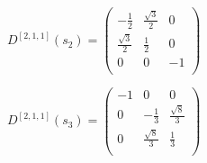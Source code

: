 \documentclass{article}
\begin{document}
$D^{[2,1,1]}(s_2) = \begin{pmatrix}
  -\frac{1}{2} & \frac{\sqrt{3}}{2} & 0 \\
  \frac{\sqrt{3}}{2} & \frac{1}{2} & 0 \\
  0 & 0 & -1 \\
\end{pmatrix}$

$D^{[2,1,1]}(s_3) = \begin{pmatrix}
  -1 & 0 & 0 \\
  0 & -\frac{1}{3} & \frac{\sqrt{8}}{3} \\
  0 & \frac{\sqrt{8}}{3} & \frac{1}{3} \\
\end{pmatrix}$
\end{document}
